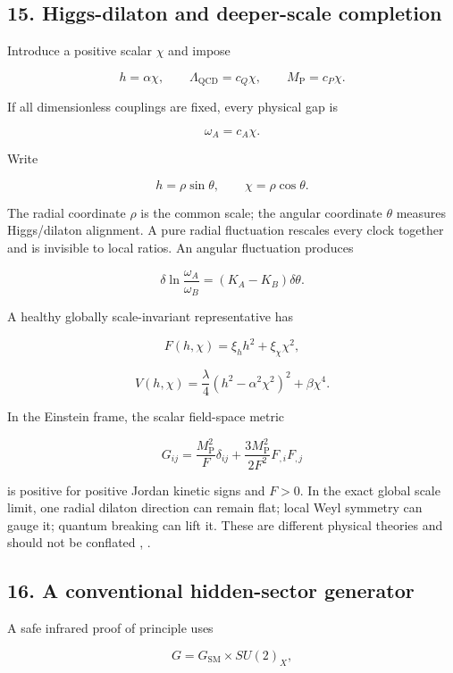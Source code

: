 \documentclass[
]{article}
\begin{document}
\subsection{15. Higgs-dilaton and deeper-scale
completion}\label{higgs-dilaton-and-deeper-scale-completion}

Introduce a positive scalar \(\chi\) and impose

\[
\boxed{
h=\alpha\chi,
\qquad
\Lambda_{\mathrm{QCD}}=c_Q\chi,
\qquad
M_{\mathrm{P}}=c_P\chi.
}
\]

If all dimensionless couplings are fixed, every physical gap is

\[
\omega_A=c_A\chi.
\]

Write

\[
h=\rho\sin\theta,
\qquad
\chi=\rho\cos\theta.
\]

The radial coordinate \(\rho\) is the common scale; the angular
coordinate \(\theta\) measures Higgs/dilaton alignment. A pure radial
fluctuation rescales every clock together and is invisible to local
ratios. An angular fluctuation produces

\[
\delta\ln\frac{\omega_A}{\omega_B}
=(K_A-K_B)\delta\theta.
\]

A healthy globally scale-invariant representative has

\[
F(h,\chi)=\xi_hh^2+\xi_\chi\chi^2,
\]

\[
V(h,\chi)=\frac\lambda4(h^2-\alpha^2\chi^2)^2+\beta\chi^4.
\]

In the Einstein frame, the scalar field-space metric

\[
G_{ij}=\frac{M_{\mathrm{P}}^2}{F}\delta_{ij}
+\frac{3M_{\mathrm{P}}^2}{2F^2}F_{,i}F_{,j}
\]

is positive for positive Jordan kinetic signs and \(F>0\). In the exact
global scale limit, one radial dilaton direction can remain flat; local
Weyl symmetry can gauge it; quantum breaking can lift it. These are
different physical theories and should not be conflated
,
.

\subsection{16. A conventional hidden-sector
generator}\label{a-conventional-hidden-sector-generator}

A safe infrared proof of principle uses

\[
G=G_{\mathrm{SM}}\times SU(2)_X,
\]
\end{document}
